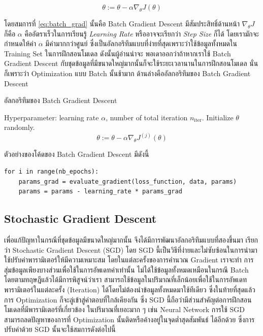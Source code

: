 \begin{equation}\label{eq:batch_grad}
    \theta := \theta - \alpha\nabla_\theta J(\theta)
\end{equation}

\noindent โดยสมการที่ \ref{eq:batch_grad} นั้นคือ Batch Gradient Descent มีสัมประสิทธิ์ด้านหน้า $\nabla_\theta J$ ก็คือ 
$\alpha$ คืออัตราเร็วในการเรียนรู้ \textit{Learning Rate} หรืออาจจะเรียกว่า \textit{Step Size} ก็ได้ โดยเรามักจะกำหนดให้ค่า 
$\alpha$ มีค่ามากกว่าศูนย์ ซึ่งเป็นอัลกอริทึมแบบที่ง่ายที่สุดเพราะว่าใช้ข้อมูลทั้งหมดใน Training Set ในการฝึกสอนโมเดล ดังนั้นผู้อ่านน่าจะ%
พอเดาออกว่าถ้าหากเราใช้ Batch Gradient Descent กับชุดข้อมูลที่มีขนาดใหญ่มากนั้นก็จะใช้ระยะเวลานานในการฝึกสอนโมเดล นั่นก็เพราะว่า 
Optimization แบบ Batch นั้นช้ามาก ด้านล่างคืออัลกอริทึมของ Batch Gradient Descent

\begin{algorithm}[ht]
    \caption{อัลกอริทึมของ Batch Gradient Descent}
    \label{alg:batch_grad}
    \begin{algorithmic}
    \State Hyperparameter: learning rate $\alpha$, number of total iteration $n_\text{iter}$.
    \State Initialize $\theta$ randomly.
        \begin{equation*}
            \theta := \theta - \alpha\nabla_\theta J^{(j)}(\theta)
        \end{equation*}
    \EndFor
    \end{algorithmic}
\end{algorithm}

\noindent ตัวอย่างของโค้ดของ Batch Gradient Descent มีดังนี้

\begin{lstlisting}[style=MyPython]
for i in range(nb_epochs):
    params_grad = evaluate_gradient(loss_function, data, params)
    params = params - learning_rate * params_grad
\end{lstlisting}

\subsection{Stochastic Gradient Descent}
\label{ssec:stochastic_grad}

เพื่อแก้ปัญหาในกรณีที่ชุดข้อมูลมีขนาดใหญ่มากนั้น จึงได้มีการพัฒนาอัลกอริทึมแบบที่สองขึ้นมา เรียกว่า Stochastic Gradient Descent (SGD) 
โดย SGD นี้เป็นวิธีที่ง่ายและไม่ซับซ้อนในการนำมาใช้ปรับค่าพารามิเตอร์ให้มีความเหมาะสม โดยในแต่ละครั้งของการคำนวณ Gradient เราจะทำ%
การสุ่มข้อมูลเพียงบางส่วนเพื่อใช้ในการอัพเดทค่าเท่านั้น ไม่ได้ใช้ข้อมูลทั้งหมดเหมือนในกรณี Batch โดยตามทฤษฎีแล้วได้มีการพิสูจน์ว่าเรา%
สามารถใช้ข้อมูลในปริมาณที่เล็กน้อยเพื่อใช้ในการอัพเดทพารามิเตอร์ในแต่ละครั้ง (Iteration) ได้โดยไม่ต้องนำข้อมูลทั้งหมดมาใช้ทีเดียว 
ซึ่งในท้ายที่สุดแล้วการ Optimization ก็จะลู่เข้าสู่คำตอบที่ใกล้เคียงกัน ซึ่ง SGD นี้ถือว่ามีส่วนสำคัญต่อการฝึกสอนโมเดลที่มีพารามิเตอร์ที่เกี่ยวข้อง%
ในปริมาณที่เยอะมาก ๆ เช่น Neural Network การใช้ SGD สามารถลดปัญหาของการที่ Optimization นั้นติดหรือค้างอยู่ในจุดต่ำสุดสัมพันธ์%
ได้อีกด้วย ซึ่งการปรับค่าด้วย SGD นั้นจะใช้สมการดังต่อไปนี้

